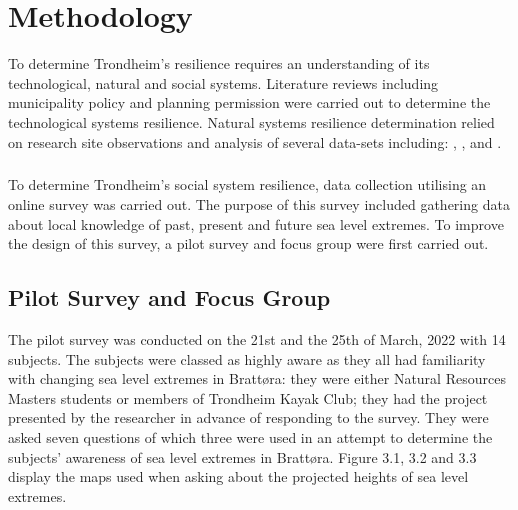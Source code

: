 
\chapter{Methodology}
To determine Trondheim's resilience requires an understanding of its technological, natural and social systems. Literature reviews including municipality policy and planning permission were carried out to determine the technological systems resilience. Natural systems resilience determination relied on research site observations and analysis of several  data-sets including: \cite{geonorge_stormflo_nodate} , \cite{kartverket_se_2021}, \cite{stormflo_database_stormflo_2021} and \cite{ipcc_sea_2021}. 
\paragraph{}
To determine Trondheim's social system resilience, data collection utilising an online survey was carried out. The purpose of this survey included gathering data about local knowledge of past, present and future sea level extremes. To improve the design of this survey, a pilot survey and focus group were first carried out.  

\section{Pilot Survey and Focus Group}

The pilot survey was conducted on the 21st and the 25th of March, 2022 with 14 subjects. The subjects were classed as highly aware as they all had familiarity with changing sea level extremes in Brattøra: they were either Natural Resources Masters students or members of Trondheim Kayak Club; they had the project presented by the researcher in advance of responding to the survey. They were asked seven questions of which three were used in an attempt to determine the subjects' awareness of sea level extremes in Brattøra. Figure 3.1, 3.2 and 3.3 display the maps used when asking about the projected heights of sea level extremes.

